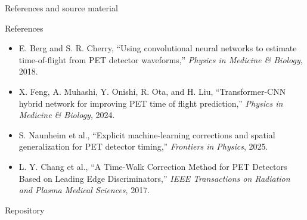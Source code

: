 \begin{frame}{References and source material}
\footnotesize


\begin{block}{References}
\begin{itemize}
  \item E. Berg and S. R. Cherry, ``Using convolutional neural networks to estimate time-of-flight from PET detector waveforms,'' \textit{Physics in Medicine \& Biology}, 2018.
  \item X. Feng, A. Muhashi, Y. Onishi, R. Ota, and H. Liu, ``Transformer-CNN hybrid network for improving PET time of flight prediction,'' \textit{Physics in Medicine \& Biology}, 2024.
  \item S. Naunheim et al., ``Explicit machine-learning corrections and spatial generalization for PET detector timing,'' \textit{Frontiers in Physics}, 2025.
  \item L. Y. Chang et al., ``A Time-Walk Correction Method for PET Detectors Based on Leading Edge Discriminators,'' \textit{IEEE Transactions on Radiation and Plasma Medical Sciences}, 2017.
\end{itemize}
\end{block}

\begin{block}{Repository}
\repo
\end{block}

\end{frame}
